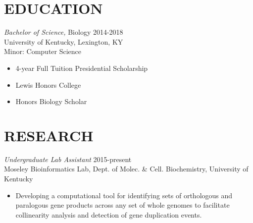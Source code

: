 \documentclass[margin, 10pt]{res} %
\begin{document}
\begin{resume}





\section{EDUCATION}

{\sl Bachelor of Science,} Biology \hfill 2014-2018 \\
University of Kentucky, Lexington, KY \\
Minor: Computer Science
\begin{itemize} \itemsep -2pt %
\item 4-year Full Tuition Presidential Scholarship
\item Lewis Honors College
\item Honors Biology Scholar
\end{itemize}


\section{RESEARCH}

{\sl Undergraduate Lab Assistant} \hfill 2015-present \\
Moseley Bioinformatics Lab, Dept. of Molec. \& Cell. Biochemistry, University of Kentucky
\begin{itemize} \itemsep -2pt %
\item Developing a computational tool for identifying sets of orthologous and paralogous gene products across any set of whole genomes to facilitate collinearity analysis and detection of gene duplication events.
\end{itemize}


\end{resume}
\end{document}
